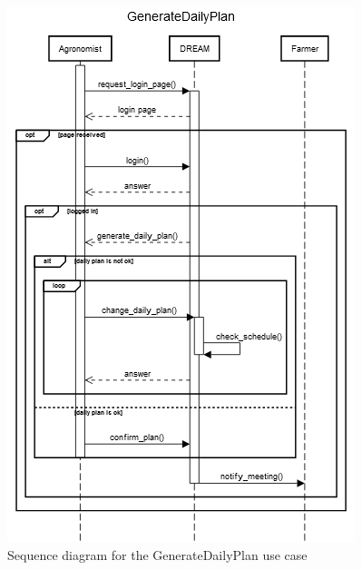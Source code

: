 \documentclass{article}
\begin{document}
\begin{figure}[H]
    \centering
    \includegraphics[scale=0.75]{sequence_diagrams/GenerateDailyPlan}
    \caption{Sequence diagram for the GenerateDailyPlan use case}
\end{figure}


\end{document}
